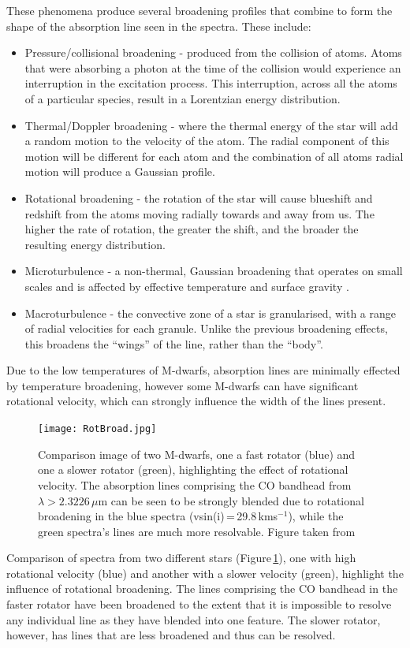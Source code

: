 These phenomena produce several broadening profiles that combine to form the shape of the absorption line seen in the spectra. These include:
\begin{itemize}
\item{Pressure/collisional broadening - produced from the collision of atoms. Atoms that were absorbing a photon at the time of the collision would experience an interruption in the excitation process. This interruption, across all the atoms of a particular species, result in a Lorentzian energy distribution.}
\item{Thermal/Doppler broadening - where the thermal energy of the star will add a random motion to the velocity of the atom. The radial component of this motion will be different for each atom and the combination of all atoms radial motion will produce a Gaussian profile.}
\item{Rotational broadening - the rotation of the star will cause blueshift and redshift from the atoms moving radially towards and away from us. The higher the rate of rotation, the greater the shift, and the broader the resulting energy distribution.}
\item{Microturbulence - a non-thermal, Gaussian broadening that operates on small scales and is affected by effective temperature and surface gravity \citep{2007Montalban}.}
\item{Macroturbulence - the convective zone of a star is granularised, with a range of  radial velocities for each granule. Unlike the previous broadening effects, this broadens the ``wings'' of the line, rather than the ``body''.}
\end{itemize}

Due to the low temperatures of M-dwarfs, absorption lines are minimally effected by temperature broadening, however some M-dwarfs can have significant rotational velocity, which can strongly influence the width of the lines present.\\

\begin{figure}
\texttt{[image: RotBroad.jpg]}
\caption{Comparison image of two M-dwarfs, one a fast rotator (blue) and one a slower rotator (green), highlighting the effect of rotational velocity. The absorption lines comprising the CO bandhead from $\lambda > 2.3226\,\mu$m can be seen to be strongly blended due to rotational broadening in the blue spectra (vsin(i)\,=\,29.8\,kms$^{-1}$), while the green spectra's lines are much more resolvable. Figure taken from \cite{2018Kesseli}}
\label{FigRotation}
\end{figure}
Comparison of spectra from two different stars (Figure\,\ref{FigRotation}), one with high rotational velocity (blue) and another with a slower velocity (green), highlight the influence of rotational broadening. The lines comprising the CO bandhead in the faster rotator have been broadened to the extent that it is impossible to resolve any individual line as they have blended into one feature. The slower rotator, however, has lines that are less broadened and thus can be resolved.\\

